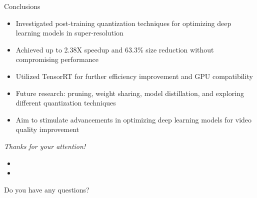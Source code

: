 \documentclass{beamer}
\begin{document}
\begin{frame}{Conclusions}
\begin{itemize}
  \item Investigated post-training quantization techniques for optimizing deep learning models in super-resolution
  \item Achieved up to 2.38X speedup and 63.3\% size reduction without compromising performance
  \item Utilized TensorRT for further efficiency improvement and GPU compatibility
  \item Future research: pruning, weight sharing, model distillation, and exploring different quantization techniques
  \item Aim to stimulate advancements in optimizing deep learning models for video quality improvement
\end{itemize}
\end{frame}

\begin{frame}[c,noframenumbering]

  {\Huge \emph{Thanks for your attention!}}

  \begin{itemize}
    \item[]
    \item[]
  \end{itemize}

  \LARGE Do you have any questions?

\end{frame}
\end{document}
